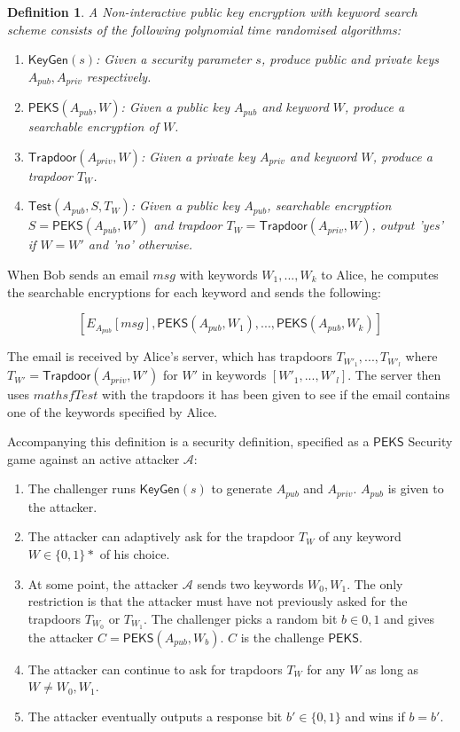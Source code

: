 \documentclass[a4paper,11pt]{article}
\newtheorem{definition}{Definition}
\begin{document}
    \begin{definition}
        A Non-interactive public key encryption with keyword search scheme consists of the following polynomial time randomised algorithms:

        \begin{enumerate}
            \item $\mathsf{KeyGen}(s)$: Given a security parameter $s$, produce public and private keys $A_{pub}, A_{priv}$ respectively.
            \item $\mathsf{PEKS}(A_{pub}, W)$: Given a public key $A_{pub}$ and keyword $W$, produce a searchable encryption of $W$.
            \item $\mathsf{Trapdoor}(A_{priv}, W)$: Given a private key $A_{priv}$ and keyword $W$, produce a trapdoor $T_W$.
            \item $\mathsf{Test}(A_{pub}, S, T_W)$: Given a public key $A_{pub}$, searchable encryption $S = \mathsf{PEKS}(A_{pub}, W')$ and trapdoor $T_W = \mathsf{Trapdoor}(A_{priv}, W)$, output 'yes' if $W = W'$ and 'no' otherwise.
        \end{enumerate}
    \end{definition}

    When Bob sends an email $msg$ with keywords $W_1,...,W_k$ to Alice, he computes the searchable encryptions for each keyword and sends the following:

    $$[E_{A_{pub}}[msg], \mathsf{PEKS}(A_{pub}, W_1),...,\mathsf{PEKS}(A_{pub}, W_k)]$$

    The email is received by Alice's server, which has trapdoors $T_{W'_1},...,T_{W'_l}$ where $T_{W'} = \mathsf{Trapdoor}(A_{priv}, W')$ for $W'$ in keywords $[W'_1,...,W'_l]$. The server then uses $mathsf{Test}$ with the trapdoors it has been given to see if the email contains one of the keywords specified by Alice.

    Accompanying this definition is a security definition, specified as a $\mathsf{PEKS}$ Security game against an active attacker $\mathcal{A}$:

    \begin{enumerate}
        \item The challenger runs $\mathsf{KeyGen}(s)$ to generate $A_{pub}$ and $A_{priv}$. $A_{pub}$ is given to the attacker.
        \item The attacker can adaptively ask for the trapdoor $T_W$ of any keyword $W \in \{0,1\}*$ of his choice.
        \item At some point, the attacker $\mathcal{A}$ sends two keywords $W_0, W_1$. The only restriction is that the attacker must have not previously asked for the trapdoors $T_{W_0}$ or $T_{W_1}$. The challenger picks a random bit $b \in {0,1}$ and gives the attacker $C = \mathsf{PEKS}(A_{pub}, W_b)$. $C$ is the challenge $\mathsf{PEKS}$.
        \item The attacker can continue to ask for trapdoors $T_W$ for any $W$ as long as $W \neq W_0, W_1$.
        \item The attacker eventually outputs a response bit $b' \in \{0,1\}$ and wins if $b = b'$.
    \end{enumerate}
\end{document}
